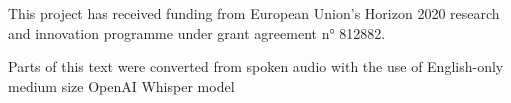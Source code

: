 This project has received funding from European Union’s Horizon 2020 research and innovation programme under grant agreement n° 812882. 

Parts of this text were converted from spoken audio with the use of English-only medium size OpenAI Whisper model \cite{radfordRobustSpeechRecognition2022}
